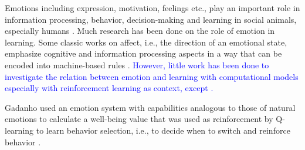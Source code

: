 Emotions including expression, %
motivation, feelings etc., play an important role in information processing, behavior, decision-making and learning in social animals, especially humans \cite{scherer2001appraisal,picard2004affective,frijda2000beliefs,berridge2003pleasures}. %
Much research has been done on the role of emotion in learning. Some classic works on affect, i.e., the direction of an emotional state, emphasize cognitive and information processing aspects in a way that can be encoded into machine-based rules %
\cite{picard2004affective,ortony1990cognitive,csikszentmihalyi1991flow}. 
\textcolor{blue}{However, little work has been done to investigate the relation between emotion and learning with computational models especially with reinforcement learning as context, except \cite{gadanho2003learning,broekens2007emotion,leite2011modelling,veeriah2016face,gordon2016affective}.}

Gadanho used an emotion system with capabilities analogous to those of natural emotions to calculate a well-being value that was used as reinforcement by Q-learning to learn behavior selection, i.e., to decide when to switch and reinforce behavior \cite{gadanho2003learning}. %

